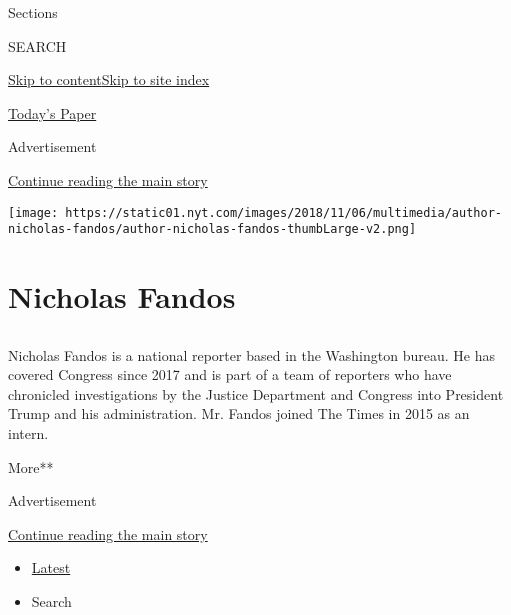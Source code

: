 Sections

SEARCH

\protect\hyperlink{site-content}{Skip to
content}\protect\hyperlink{site-index}{Skip to site index}

\href{https://myaccount.nytimes.com/auth/login?response_type=cookie\&client_id=vi}{}

\href{https://www.nytimes.com/section/todayspaper}{Today's Paper}

Advertisement

\protect\hyperlink{after-top}{Continue reading the main story}

\texttt{[image: https://static01.nyt.com/images/2018/11/06/multimedia/author-nicholas-fandos/author-nicholas-fandos-thumbLarge-v2.png]}

\hypertarget{nicholas-fandos}{%
\section{Nicholas Fandos}\label{nicholas-fandos}}

\subsection{}

Nicholas Fandos is a national reporter based in the Washington bureau.
He has covered Congress since 2017 and is part of a team of reporters
who have chronicled investigations by the Justice Department and
Congress into President Trump and his administration. Mr. Fandos joined
The Times in 2015 as an intern.

More**

Advertisement

\protect\hyperlink{after-mid1}{Continue reading the main story}

\begin{itemize}
\tightlist
\item
  \protect\hyperlink{stream-panel}{Latest}
\item
  Search
\end{itemize}

